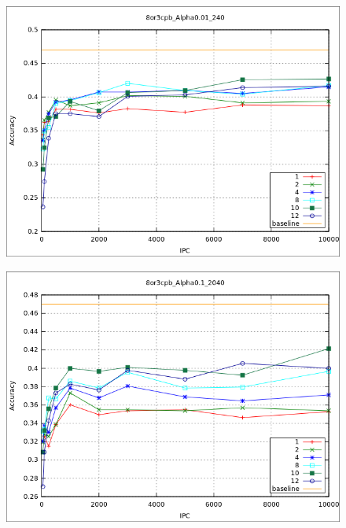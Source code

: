 			\begin{figure}[htbp]
				\centering
				\includegraphics[scale=0.6]{img/resultados/sinteticas/worst_media_8or3cpb_Alpha0,01_240.png}
				\caption[Sintéticas media mejor resultado]{}
				\label{fig: Sinteticas-media-mejor}
			\end{figure}
			
			\begin{figure}[htbp]
				\centering
				\includegraphics[scale=0.6]{img/resultados/sinteticas/best_median_8or3cpb_Alpha0,1_2040.png}
				\caption[Sintéticas mediana mejor resultado]{}
				\label{fig: Sinteticas-median-mejor}
			\end{figure}
	
